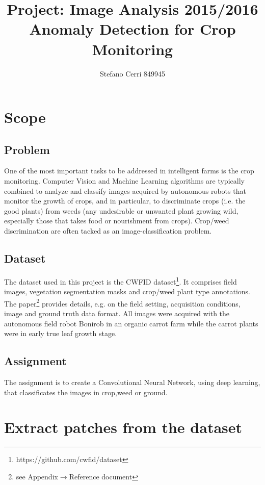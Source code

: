 \documentclass[]{report}
\title{Project: Image Analysis 2015/2016\\Anomaly Detection for Crop Monitoring}
\author{Stefano Cerri 849945}
\begin{document}
\maketitle
\tableofcontents
\listoffigures

\chapter{Scope}

\section{Problem}

One of the most important tasks to be addressed in intelligent farms is the crop monitoring. Computer Vision and Machine Learning algorithms are typically combined to analyze and classify images acquired by autonomous robots that monitor the growth of crops, and in particular, to discriminate crops (i.e. the good plants) from weeds (any undesirable or unwanted plant growing wild, especially those that takes food or nourishment from crops). Crop/weed discrimination are often tacked as an image-classification problem.


\section{Dataset}

The dataset used in this project is the CWFID dataset\footnote{https://github.com/cwfid/dataset}. It comprises field images, vegetation segmentation masks and crop/weed plant type annotations. The paper\footnote{see Appendix$\rightarrow  $Reference document} provides details, e.g. on the field setting, acquisition conditions, image and ground truth data format.
All images were acquired with the autonomous field robot Bonirob in an organic carrot farm while the carrot plants were in early true leaf growth stage.

\section{Assignment}

The assignment is to create a Convolutional Neural Network, using deep learning, that classificates the images in crop,weed or ground. 

\chapter{Extract patches from the dataset}
\end{document}
